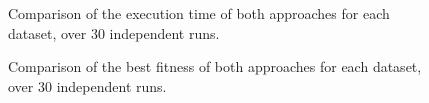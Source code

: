 \begin{figure}
\centerline{
}
\caption{Comparison of the execution time of both approaches for each dataset, over 30 independent runs.}
\label{fig:time}
\end{figure}

\begin{figure}
\centerline{
}
\caption{Comparison of the best fitness of both approaches for each dataset, over 30 independent runs.}
\label{fig:fitness}
\end{figure}

